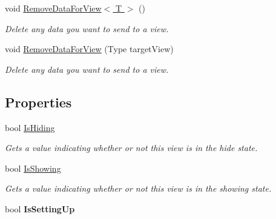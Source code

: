 \begin{DoxyCompactItemize}
void \hyperlink{class_scaffolding_1_1_view_request_a352884d93e18dbe65225c4c0f0a2a291}{Remove\+Data\+For\+View$<$ T $>$} ()
\begin{DoxyCompactList}\small\item\em Delete any data you want to send to a view. \end{DoxyCompactList}\item 
void \hyperlink{class_scaffolding_1_1_view_request_a74c5d71a0743934fba7f6980e7decd7a}{Remove\+Data\+For\+View} (Type target\+View)
\begin{DoxyCompactList}\small\item\em Delete any data you want to send to a view. \end{DoxyCompactList}\end{DoxyCompactItemize}
\subsection*{Properties}
\begin{DoxyCompactItemize}
\item 
bool \hyperlink{class_scaffolding_1_1_view_request_ae88834823495c1f661407d885e3c5e9d}{Is\+Hiding}
\begin{DoxyCompactList}\small\item\em Gets a value indicating whether or not this view is in the hide state. \end{DoxyCompactList}\item 
bool \hyperlink{class_scaffolding_1_1_view_request_a56767533f14295a74852fdb2f855504f}{Is\+Showing}
\begin{DoxyCompactList}\small\item\em Gets a value indicating whether or not this view is in the showing state. \end{DoxyCompactList}\item 
\hypertarget{class_scaffolding_1_1_view_request_af715820a9f7d30c529a29013fce1100c}{bool {\bfseries Is\+Setting\+Up}}\label{class_scaffolding_1_1_view_request_af715820a9f7d30c529a29013fce1100c}

\end{DoxyCompactItemize}


